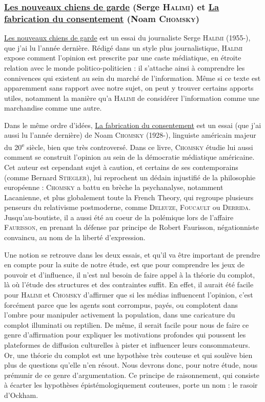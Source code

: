 \documentclass[a4paper,10pt]{article}
\begin{document}
\subsubsection{\underline{Les nouveaux chiens de garde} (Serge \textsc{Halimi}) et \underline{La fabrication du consentement} (Noam \textsc{Chomsky})}

\underline{Les nouveaux chiens de garde} est un essai du journaliste Serge \textsc{Halimi} (1955-), que j'ai lu l'année dernière. Rédigé dans un style plus journalistique, \textsc{Halimi} expose comment l'opinion est prescrite par une caste médiatique, en étroite relation avec le monde politico-politicien : il s'attache ainsi à comprendre les connivences qui existent au sein du marché de l'information. Même si ce texte est apparemment sans rapport avec notre sujet, on peut y trouver certains apports utiles, notamment la manière qu'a \textsc{Halimi} de considérer l'information comme une marchandise comme une autre. 

Dans le même ordre d'idées, \underline{La fabrication du consentement} est un essai (que j'ai aussi lu l'année dernière) de Noam \textsc{Chomsky} (1928-), linguiste américain majeur du 20\textsuperscript{e} siècle, bien que très controversé. Dans ce livre, \textsc{Chomsky} étudie lui aussi comment se construit l'opinion au sein de la démocratie médiatique américaine. Cet auteur est cependant sujet à caution, et certains de ses contemporains (comme Bernard \textsc{Stiegler}), lui reprochent un dédain injustifié de la philosophie européenne : \textsc{Chomsky} a battu en brèche la psychanalyse, notamment Lacanienne, et plus globalement toute la French Theory, qui regroupe plusieurs penseurs du relativisme postmoderne, comme \textsc{Deleuze}, \textsc{Foucault} ou \textsc{Derrida}. Jusqu'au-boutiste, il a aussi été au coeur de la polémique lors de l'affaire \textsc{Faurisson}, en prenant la défense par principe de Robert Faurisson, négationniste convaincu, au nom de la liberté d'expression.

Une notion se retrouve dans les deux essais, et qu'il va être important de prendre en compte pour la suite de notre étude, est que pour comprendre les jeux de pouvoir et d'influence, il n'est nul besoin de faire appel à la théorie du complot, là où l'étude des structures et des contraintes suffit. En effet, il aurait été facile pour \textsc{Halimi} et \textsc{Chomsky} d'affirmer que si les médias influencent l'opinion, c'est forcément parce que les agents sont corrompus, payés, ou complotent dans l'ombre pour manipuler activement la population, dans une caricature du complot illuminati ou reptilien. De même, il serait facile pour nous de faire ce genre d'affirmation pour expliquer les motivations profondes qui poussent les plateformes de diffusion culturelles à pister et influencer leurs consommateurs. Or, une théorie du complot est une hypothèse très couteuse et qui soulève bien plus de questions qu'elle n'en résout. Nous devrons donc, pour notre étude, nous prémunir de ce genre d'argumentation. Ce principe de raisonnement, qui consiste à écarter les hypothèses épistémologiquement couteuses, porte un nom : le rasoir d'Ockham.
\end{document}
